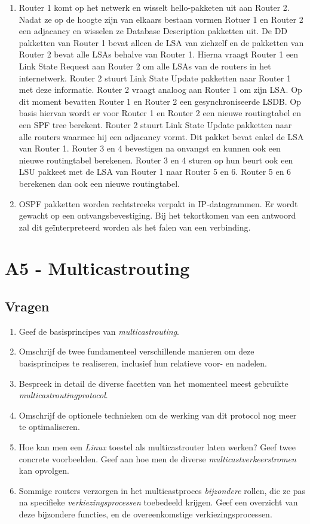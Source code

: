 \documentclass{report}
\begin{document}
\begin{enumerate}
\item Router 1 komt op het netwerk en wisselt hello-pakketen uit aan Router 2. Nadat ze op de hoogte zijn van elkaars bestaan vormen Rotuer 1 en Router 2 een adjacancy en wisselen ze Database Description pakketten uit. De DD pakketten van Router 1 bevat alleen de LSA van zichzelf en de pakketten van Router 2 bevat alle LSAs behalve van Router 1. Hierna vraagt Router 1 een Link State Request aan Router 2 om alle LSAs van de routers in het internetwerk. Router 2 stuurt Link State Update pakketten naar Router 1 met deze informatie. Router 2 vraagt analoog aan Router 1 om zijn LSA. Op dit moment bevatten Router 1 en Router 2 een gesynchroniseerde LSDB. Op basis hiervan wordt er voor Router 1 en Router 2 een nieuwe routingtabel en een SPF tree berekent. Router 2 stuurt Link State Update pakketten naar alle routers waarmee hij een adjacancy vormt. Dit pakket bevat enkel de LSA van Router 1. Router 3 en 4 bevestigen na onvangst en kunnen ook een nieuwe routingtabel berekenen. Router 3 en 4 sturen op hun beurt ook een LSU pakkeet met de LSA van Router 1 naar Router 5 en 6. Router 5 en 6 berekenen dan ook een nieuwe routingtabel.

\item OSPF pakketten worden rechtstreeks verpakt in IP-datagrammen. Er wordt gewacht op een ontvangsbevestiging. Bij het tekortkomen van een antwoord zal dit geïnterpreteerd worden als het falen van een verbinding.

\end{enumerate}


\newpage
\section{A5 - Multicastrouting}
\subsection{Vragen}
\begin{enumerate}
	\item Geef de basisprincipes van \textit{multicastrouting}.
	\item Omschrijf de twee fundamenteel verschillende manieren om deze basisprincipes te realiseren, inclusief hun relatieve voor- en nadelen.
	\item Bespreek in detail de diverse facetten van het momenteel meest gebruikte \textit{multicastroutingprotocol}.
	\item Omschrijf de optionele technieken om de werking van dit protocol nog meer te optimaliseren.
	\item Hoe kan men een \textit{Linux} toestel als multicastrouter laten werken? Geef twee concrete voorbeelden. Geef aan hoe men de diverse \textit{multicastverkeerstromen} kan opvolgen.
	\item Sommige routers verzorgen in het multicastproces \textit{bijzondere} rollen, die ze pas na specifieke \textit{verkiezingsprocessen} toebedeeld krijgen. Geef een overzicht van deze bijzondere functies, en de overeenkomstige verkiezingsprocessen.
\end{enumerate}
\end{document}
